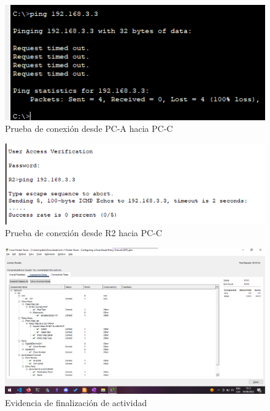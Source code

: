 \documentclass[11pt]{article}
\begin{document}
        \begin{figure}[!h]
            \centering
            \includegraphics[scale=0.8]{img/part7-step1.png}
            \caption{Prueba de conexión desde PC-A hacia PC-C}
            \label{fig:part7-step1}
        \end{figure}

        \begin{figure}[!h]
            \centering
            \includegraphics[scale=0.8]{img/part7-step2.png}
            \caption{Prueba de conexión desde R2 hacia PC-C}
            \label{fig:part7-step2}
        \end{figure}
        
        \begin{landscape}
            \begin{figure}[!h]
                \centering
                \includegraphics[scale=0.5]{img/part7-step3.png}
                \caption{Evidencia de finalización de actividad}
                \label{fig:part7-step3}
            \end{figure}
        \end{landscape}
\end{document}
